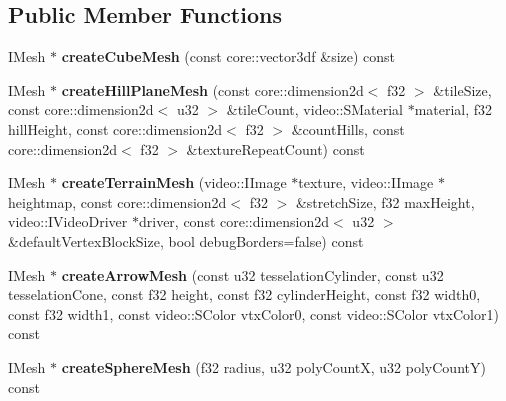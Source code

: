 \subsection*{Public Member Functions}
\begin{DoxyCompactItemize}
\item 
\hypertarget{classirr_1_1scene_1_1_c_geometry_creator_af284e89b237136d78c5efd8e50c88902}{I\-Mesh $\ast$ {\bfseries create\-Cube\-Mesh} (const core\-::vector3df \&size) const }\label{classirr_1_1scene_1_1_c_geometry_creator_af284e89b237136d78c5efd8e50c88902}

\item 
\hypertarget{classirr_1_1scene_1_1_c_geometry_creator_a2196a7ad66907c8713a466fd1e40ef98}{I\-Mesh $\ast$ {\bfseries create\-Hill\-Plane\-Mesh} (const core\-::dimension2d$<$ f32 $>$ \&tile\-Size, const core\-::dimension2d$<$ u32 $>$ \&tile\-Count, video\-::\-S\-Material $\ast$material, f32 hill\-Height, const core\-::dimension2d$<$ f32 $>$ \&count\-Hills, const core\-::dimension2d$<$ f32 $>$ \&texture\-Repeat\-Count) const }\label{classirr_1_1scene_1_1_c_geometry_creator_a2196a7ad66907c8713a466fd1e40ef98}

\item 
\hypertarget{classirr_1_1scene_1_1_c_geometry_creator_a24de1d83233590b4a437a1e42f206961}{I\-Mesh $\ast$ {\bfseries create\-Terrain\-Mesh} (video\-::\-I\-Image $\ast$texture, video\-::\-I\-Image $\ast$heightmap, const core\-::dimension2d$<$ f32 $>$ \&stretch\-Size, f32 max\-Height, video\-::\-I\-Video\-Driver $\ast$driver, const core\-::dimension2d$<$ u32 $>$ \&default\-Vertex\-Block\-Size, bool debug\-Borders=false) const }\label{classirr_1_1scene_1_1_c_geometry_creator_a24de1d83233590b4a437a1e42f206961}

\item 
\hypertarget{classirr_1_1scene_1_1_c_geometry_creator_a7a573b8c31062be23b085356a2ffef35}{I\-Mesh $\ast$ {\bfseries create\-Arrow\-Mesh} (const u32 tesselation\-Cylinder, const u32 tesselation\-Cone, const f32 height, const f32 cylinder\-Height, const f32 width0, const f32 width1, const video\-::\-S\-Color vtx\-Color0, const video\-::\-S\-Color vtx\-Color1) const }\label{classirr_1_1scene_1_1_c_geometry_creator_a7a573b8c31062be23b085356a2ffef35}

\item 
\hypertarget{classirr_1_1scene_1_1_c_geometry_creator_a4188d2b1e686f2d130f72968daf0d8a4}{I\-Mesh $\ast$ {\bfseries create\-Sphere\-Mesh} (f32 radius, u32 poly\-Count\-X, u32 poly\-Count\-Y) const }\label{classirr_1_1scene_1_1_c_geometry_creator_a4188d2b1e686f2d130f72968daf0d8a4}


\end{DoxyCompactItemize}
